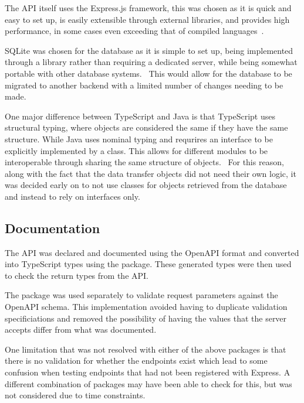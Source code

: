 
The API itself uses the Express.js framework, this was chosen as it is quick and easy to set up, is easily extensible
through external libraries, and provides high performance, in some cases even exceeding that of
compiled languages~\cite{karlsson_performance_2021}.

SQLite was chosen for the database as it is simple to set up, being implemented through
a library rather than requiring a dedicated server, while being somewhat portable with other
database systems.~\cite{kreibich_using_2010} This would allow for the database to be migrated to
another backend with a limited number of changes needing to be made.

One major difference between TypeScript and Java is that TypeScript uses structural typing, where objects are considered
the same if they have the same structure. While Java uses nominal typing and requrires an interface to be explicitly
implemented by a class. This allows for different modules to be interoperable through sharing the same structure of objects.~\cite{gil_whiteoak_2008}
For this reason, along with the fact that the data transfer objects did not need their own logic, it was decided early on
to not use classes for objects retrieved from the database and instead to rely on interfaces only.


\subsection{Documentation}
The API was declared and documented using the OpenAPI format and converted
into TypeScript types using the  package. These
generated types were then used to check the return types from the API.

The  package was used separately to validate
request parameters against the OpenAPI schema. This implementation avoided having
to duplicate validation specificiations and removed the possibility of having the values that
the server accepts differ from what was documented.

One limitation that was not resolved with either of the above packages is that there is no validation
for whether the endpoints exist which lead to some confusion when testing endpoints that had not been registered
with Express. A different combination of packages may have been able to check for this,
but was not considered due to time constraints.

